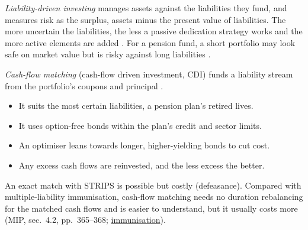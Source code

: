 \begin{qfmethod}\label{meth:liability-matching-ladders}
 \emph{Liability-driven investing} manages assets against the liabilities they fund, and measures risk as the surplus, assets minus the present value of liabilities. The more uncertain the liabilities, the less a passive dedication strategy works and the more active elements are added \citep[chap.~6, sec.~4.1, pp.~346--348]{managing-investment-portfolios-2007}. For a pension fund, a short portfolio may look safe on market value but is risky against long liabilities \citep[chap.~43, p.~1082]{s7-fabozzifixed}.

\emph{Cash-flow matching} (cash-flow driven investment, CDI) funds a liability stream from the portfolio's coupons and principal \citep[chap.~51, pp.~1271--1274]{s7-fabozzifixed}.
\begin{itemize}
\item It suits the most certain liabilities, a pension plan's retired lives.
\item It uses option-free bonds within the plan's credit and sector limits.
\item An optimiser leans towards longer, higher-yielding bonds to cut cost.
\item Any excess cash flows are reinvested, and the less excess the better.
\end{itemize}
An exact match with STRIPS is possible but costly (defeasance). Compared with multiple-liability immunisation, cash-flow matching needs no duration rebalancing for the matched cash flows and is easier to understand, but it usually costs more (MIP, sec.~4.2, pp.~365--368; \hyperref[meth:immunisation-liabilities]{immunisation}).


\end{qfmethod}
